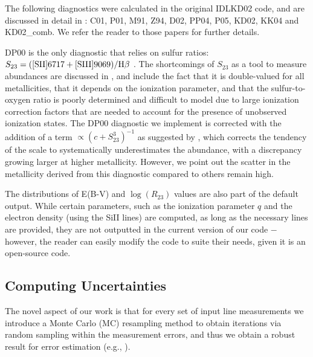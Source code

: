 \documentclass{emulateapj}
\begin{document}
The following diagnostics were calculated in the original IDLKD02 code, and are discussed in detail in \citet{kewley02,kewley08}: C01, P01, M91, Z94, D02, PP04, P05, KD02, KK04 and KD02\_comb. We refer the reader to those papers for further details.

DP00 is the only diagnostic that relies on sulfur ratios: $ S_{23}= {\rm ( [SII]6717+[SIII]9069) } / {\rm H}\beta $ . The shortcomings of $S_{23}$ as a tool to measure abundances are discussed in \citet{kewley02}, and include the fact that it is double-valued for all metallicities, that it depends on the ionization parameter, and that the sulfur-to-oxygen ratio is poorly determined and difficult to model due to large ionization correction factors that are needed to account for the presence of unobserved ionization states. The DP00 diagnostic we implement is corrected with the addition of a term $\propto (c+S_{23}^3)^{-1}$ as suggested by \citet{kewley02}, which corrects the tendency of the scale to systematically underestimates the abundance, with a discrepancy growing larger at higher metallicity. However, we point out the scatter in the metallicity derived from this diagnostic compared to others remain high. 


The distributions of E(B-V) and $\log(R_{23})$ values are also part of the default output. While certain parameters, such as the ionization parameter $q$ and the electron density (using the SiII lines) are computed, as long as the necessary lines are provided, they are not outputted in the current version of our code $-$ however, the reader can easily modify the code to suite their needs, given it is an open-source code.



\subsection{Computing Uncertainties}
The novel aspect of our work is that for every set of input line measurements we introduce a Monte Carlo (MC) resampling method to obtain iterations via random sampling within the measurement errors, and thus we obtain a robust result for error estimation (e.g., \citealt{efron79,hastie09,andrae10}). 
\end{document}
